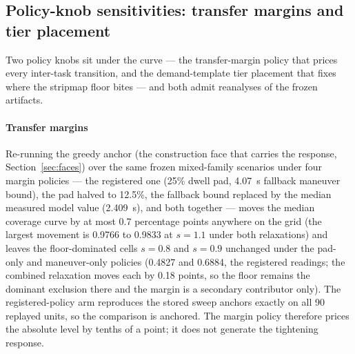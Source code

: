 \documentclass[preprint,authoryear]{elsarticle}
\begin{document}
\subsection{Policy-knob sensitivities: transfer margins and tier placement}\label{sec:knobs}

Two policy knobs sit under the curve --- the transfer-margin policy that prices every inter-task transition, and the demand-template tier placement that fixes where the stripmap floor bites --- and both admit reanalyses of the frozen artifacts.

\paragraph{Transfer margins} Re-running the greedy anchor (the construction face that carries the response, Section~\ref{sec:faces}) over the same frozen mixed-family scenarios under four margin policies --- the registered one (25\% dwell pad, 4.07~s fallback maneuver bound), the pad halved to 12.5\%, the fallback bound replaced by the median measured model value (2.409~s), and both together --- moves the median coverage curve by at most 0.7 percentage points anywhere on the grid (the largest movement is 0.9766 to 0.9833 at $s=1.1$ under both relaxations) and leaves the floor-dominated cells $s=0.8$ and $s=0.9$ unchanged under the pad-only and maneuver-only policies (0.4827 and 0.6884, the registered readings; the combined relaxation moves each by 0.18 points, so the floor remains the dominant exclusion there and the margin is a secondary contributor only). The registered-policy arm reproduces the stored sweep anchors exactly on all 90 replayed units, so the comparison is anchored. The margin policy therefore prices the absolute level by tenths of a point; it does not generate the tightening response.
\end{document}

